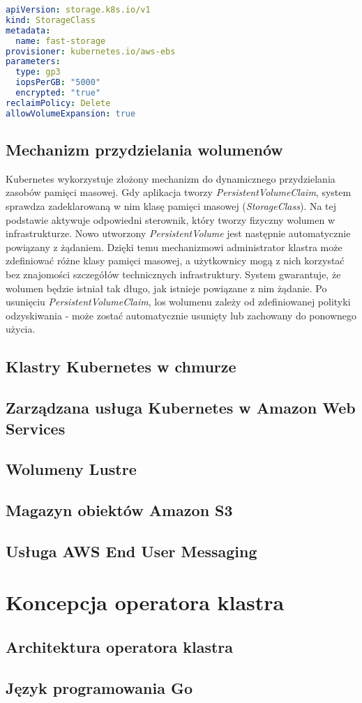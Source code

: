 \begin{lstlisting}[language=yaml,caption={Przykładowa definicja StorageClass},label={lst:sc-example}]
apiVersion: storage.k8s.io/v1
kind: StorageClass
metadata:
  name: fast-storage
provisioner: kubernetes.io/aws-ebs
parameters:
  type: gp3
  iopsPerGB: "5000"
  encrypted: "true"
reclaimPolicy: Delete
allowVolumeExpansion: true
\end{lstlisting}

\subsection{Mechanizm przydzielania wolumenów}
Kubernetes wykorzystuje złożony mechanizm do dynamicznego przydzielania zasobów pamięci masowej.
Gdy aplikacja tworzy \textit{PersistentVolumeClaim}, system sprawdza zadeklarowaną w nim klasę pamięci masowej (\textit{StorageClass}).
Na tej podstawie aktywuje odpowiedni sterownik, który tworzy fizyczny wolumen w infrastrukturze.
Nowo utworzony \textit{PersistentVolume} jest następnie automatycznie powiązany z żądaniem.
Dzięki temu mechanizmowi administrator klastra może zdefiniować różne klasy pamięci masowej, a użytkownicy mogą z nich korzystać bez znajomości szczegółów technicznych infrastruktury.
System gwarantuje, że wolumen będzie istniał tak długo, jak istnieje powiązane z nim żądanie.
Po usunięciu \textit{PersistentVolumeClaim}, los wolumenu zależy od zdefiniowanej polityki odzyskiwania - może zostać automatycznie usunięty lub zachowany do ponownego użycia.

\subsection{Klastry Kubernetes w chmurze}

\subsection{Zarządzana usługa Kubernetes w Amazon Web Services}

\subsection{Wolumeny Lustre}

\subsection{Magazyn obiektów Amazon S3}

\subsection{Usługa AWS End User Messaging}


\section{Koncepcja operatora klastra}

\subsection{Architektura operatora klastra}

\subsection{Język programowania Go}